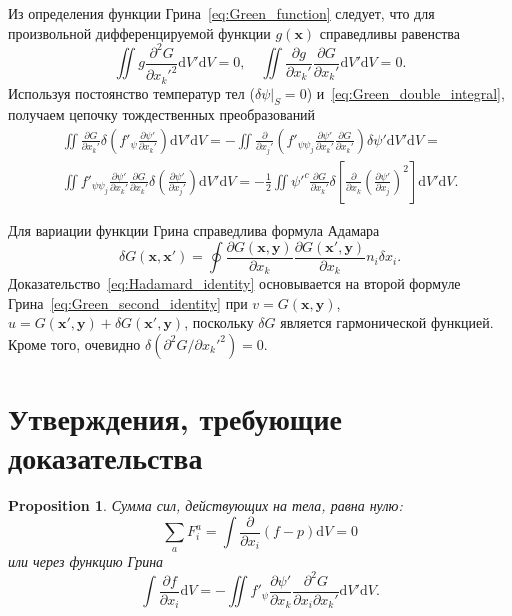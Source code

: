 \documentclass{article}
\theoremstyle{plain}
\newtheorem{proposition}{Proposition}
\newcommand{\dd}{\mathrm{d}}
\newcommand{\pder}[2][]{\frac{\partial#1}{\partial#2}}
\newcommand{\pderdual}[2][]{\frac{\partial^2#1}{\partial#2^2}}
\newcommand{\pderder}[3][]{\frac{\partial^2#1}{\partial#2\partial#3}}
\newcommand{\Pderdual}[2][]{\partial^2#1/\partial#2^2}
\newcommand{\bx}{\boldsymbol{x}}
\newcommand{\by}{\boldsymbol{y}}
\begin{document}
Из определения функции Грина~\eqref{eq:Green_function} следует,
что для произвольной дифференцируемой функции \(g(\bx)\) справедливы равенства
\begin{equation}\label{eq:Green_double_integral}
    \iint g\pderdual[G]{x_k'}\dd{V'}\dd{V} = 0, \quad
    \iint \pder[g]{x_k'}\pder[G]{x_k'}\dd{V'}\dd{V} = 0.
\end{equation}
Используя постоянство температур тел (\(\delta\psi|_S=0\)) и~\eqref{eq:Green_double_integral},
получаем цепочку тождественных преобразований
\begin{multline}\label{eq:variation_energy3}
    \iint \pder[G]{x_k'}\delta\left( f'_\psi\pder[\psi']{x_k'} \right) \dd{V'}\dd{V} =
    -\iint \pder{x_j'}\left( f'_{\psi\psi_j}\pder[\psi']{x_k'}\pder[G]{x_k'} \right)\delta\psi' \dd{V'}\dd{V} = \\
    \iint f'_{\psi\psi_j}\pder[\psi']{x_k'}\pder[G]{x_k'} \delta\left(\pder[\psi']{x_j'}\right) \dd{V'}\dd{V} =
    -\frac12\iint \psi'^c\pder[G]{x_k'} \delta\left[\pder{x_k}\left(\pder[\psi']{x_j}\right)^2\right] \dd{V'}\dd{V}.
\end{multline}

Для вариации функции Грина справедлива формула Адамара~\cite{Hadamard1908, Schiffer1958}
\begin{equation}\label{eq:Hadamard_identity}
    \delta{G}(\bx,\bx') = \oint\pder[G(\bx,\by)]{x_k}\pder[G(\bx',\by)]{x_k} n_i\delta{x_i}.
\end{equation}
Доказательство~\eqref{eq:Hadamard_identity} основывается на второй формуле Грина~\eqref{eq:Green_second_identity}
при \(v=G(\bx,\by)\), \(u=G(\bx',\by)+\delta{G}(\bx',\by)\), поскольку \(\delta{G}\) является гармонической функцией.
Кроме того, очевидно \(\delta(\Pderdual[G]{x_k'}) = 0\).

\section{Утверждения, требующие доказательства}

\begin{proposition}
    Сумма сил, действующих на тела, равна нулю:
    \begin{equation}\label{eq:problem1}
        \sum_a F^a_i = \int \pder{x_i}(f-p) \dd{V} = 0
    \end{equation}
    или через функцию Грина
    \begin{equation}\label{eq:problem1_Green}
        \int \pder[f]{x_i} \dd{V} = -\iint f'_\psi\pder[\psi']{x_k} \pderder[G]{x_i}{x_k'} \dd{V'}\dd{V}.
    \end{equation}
\end{proposition}
\end{document}
